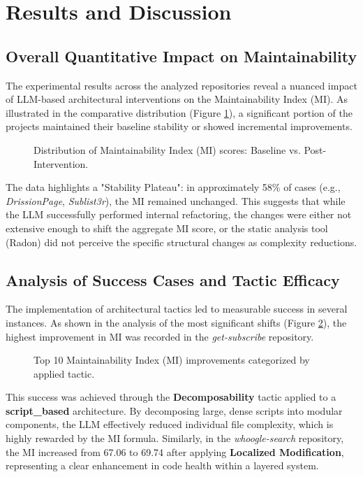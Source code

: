 \documentclass[sigconf,review]{acmart}
\begin{document}
\section{Results and Discussion}

\subsection{Overall Quantitative Impact on Maintainability}

The experimental results across the analyzed repositories reveal a nuanced impact of LLM-based architectural interventions on the Maintainability Index (MI). As illustrated in the comparative distribution (Figure \ref{fig:mi_dist}), a significant portion of the projects maintained their baseline stability or showed incremental improvements. 

\begin{figure}[htbp]
    \centering
    \resizebox{0.5\textwidth}{!}{}
    \caption{Distribution of Maintainability Index (MI) scores: Baseline vs. Post-Intervention.}
    \label{fig:mi_dist}
\end{figure}

The data highlights a "Stability Plateau": in approximately 58\% of cases (e.g., \textit{DrissionPage}, \textit{Sublist3r}), the MI remained unchanged. This suggests that while the LLM successfully performed internal refactoring, the changes were either not extensive enough to shift the aggregate MI score, or the static analysis tool (Radon) did not perceive the specific structural changes as complexity reductions.

\subsection{Analysis of Success Cases and Tactic Efficacy}
The implementation of architectural tactics led to measurable success in several instances. As shown in the analysis of the most significant shifts (Figure \ref{fig:top10_shifts}), the highest improvement in MI was recorded in the \textit{get-subscribe} repository. 

\begin{figure}[htbp]
    \centering
    \resizebox{0.5\textwidth}{!}{}
    \caption{Top 10 Maintainability Index (MI) improvements categorized by applied tactic.}
    \label{fig:top10_shifts}
\end{figure}

This success was achieved through the \textbf{Decomposability} tactic applied to a \textbf{script\_based} architecture. By decomposing large, dense scripts into modular components, the LLM effectively reduced individual file complexity, which is highly rewarded by the MI formula. Similarly, in the \textit{whoogle-search} repository, the MI increased from 67.06 to 69.74 after applying \textbf{Localized Modification}, representing a clear enhancement in code health within a layered system.
\end{document}
